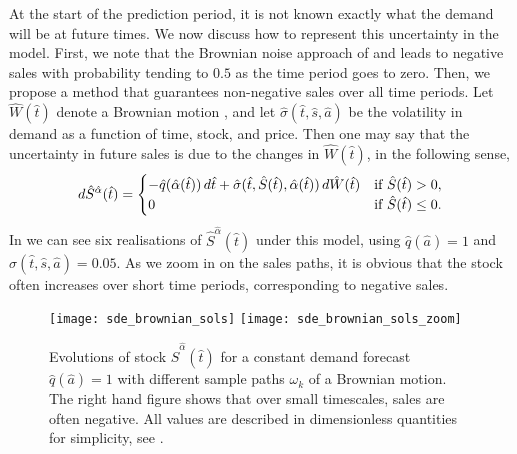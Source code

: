 \documentclass[main.tex]{subfiles}
\begin{document}
At the start of the prediction period, it is not known exactly what
the demand will be at future times. We now discuss how to
represent this uncertainty in the model. First, we note that the Brownian noise
approach of \citet{raman1995optimal} and \citet{wu2016dynamic} leads to negative
sales with probability tending to $0.5$ as the time period goes to zero.
Then, we propose a method that guarantees non-negative sales over all
time periods.
Let $\hat{W}(\hat{t})$ denote a Brownian motion
\citep{oksendal2000stochastic}, and let
$\hat{\sigma}(\hat{t},\hat{s},\hat{a})$ be the volatility
in demand as a function of time, stock, and price. Then
one may say that the uncertainty in future
sales is due to the changes in $\hat{W}(\hat{t})$, in the following sense,
\begin{equation}\label{eq:brownian_noise}
  d\hat{S}^{\hat{\alpha}}(\hat{t}) =
  \begin{cases}
    -\hat{q}(\hat{\alpha}(\hat{t}))\,d\hat{t} +
    \hat{\sigma}(\hat{t},\hat{S}(\hat{t}),\hat{\alpha}(\hat{t}))\,d\hat{W}(\hat{t})
    & \textnormal{if } \hat{S}(\hat{t})>0,\\
    0 &  \textnormal{if } \hat{S}(\hat{t})\leq0.
  \end{cases}
\end{equation}
In  we can see six realisations of
$\hat{S}^{\hat{\alpha}}(\hat{t})$ under
this model, using $\hat{q}(\hat{a})=1$ and $\hat{\sigma}(\hat{t},\hat{s},\hat{a})=0.05$. As we zoom in on
the sales paths, it is obvious that the stock often
increases over short time periods, corresponding to negative sales.
\begin{figure}[htbp]
  \centering
  \texttt{[image: sde\_brownian\_sols]}%
  \texttt{[image: sde\_brownian\_sols\_zoom]}
  \caption[Evolutions of stock for a constant demand forecast]{Evolutions of stock $\hat{S}^{\hat{\alpha}}(\hat{t})$ for a constant
    demand forecast $\hat{q}(\hat{a})=1$ with different sample paths $\omega_k$
    of a Brownian motion.
    The right hand figure shows that over small timescales, sales are
    often negative.
    All values are described in dimensionless quantities for
    simplicity, see .
  }\label{fig:brownian_paths}
\end{figure}
\end{document}
